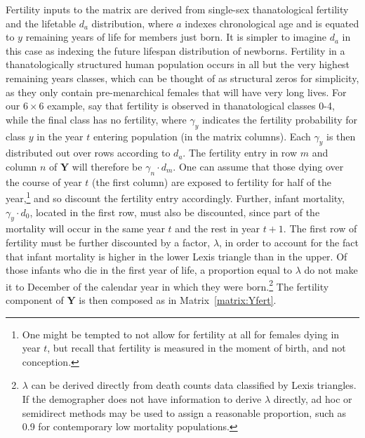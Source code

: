 \documentclass{article}
\begin{document}
 Fertility inputs to the matrix are derived from single-sex thanatological
 fertility and the lifetable $d_a$ distribution, where $a$ indexes
 chronological age and is equated to $y$ remaining years of life for members
 just born. It is simpler to imagine $d_a$ in this case as indexing the
 future lifespan distribution of newborns. Fertility in a thanatologically
 structured human population occurs in all but the very highest remaining years classes, which can be thought of as structural zeros for simplicity, as they only contain pre-menarchical females
 that will have very long lives.
 For our $6\times 6$ example, say that fertility is observed in
 thanatological classes 0-4, while the final class has no fertility, where
 $\gamma_y$ indicates the fertility probability for class $y$ in the year $t$
 entering population (in the matrix columns). Each $\gamma_y$ is then
 distributed out over rows according to $d_a$.
 The fertility entry in row $m$ and column $n$ of $\textbf{Y}$ will therefore be
 $\gamma_n \cdot d_m$. One can assume that those dying over the course of year
 $t$ (the first column) are exposed to fertility for half of the year,\footnote{One might be tempted to not allow for fertility at all for females dying in year $t$, but recall that fertility is measured in the moment of
 birth, and not conception.} and so discount the fertility entry
 accordingly.
 Further, infant mortality, $\gamma_y \cdot d_0$, located in the first row, must also be discounted, since part
 of the mortality will occur in the same year $t$ and the rest in year $t + 1$. 
 The first row of fertility must be further discounted by a factor, $\lambda$,
 in order to account for the fact that infant mortality is higher in the lower Lexis 
 triangle than in the upper. Of those infants who die in the first year of life,
 a proportion equal to $\lambda$ do not make it to December  of the calendar year in which
 they were born.\footnote{$\lambda$ can be derived directly from death counts
 data classified by Lexis triangles. If the demographer
 does not have information to derive $\lambda$ directly, ad hoc or semidirect
 methods may be used to assign a reasonable proportion, such as 0.9 for
 contemporary low mortality populations.} The fertility component of $\textbf{Y}$ is then composed as in Matrix~\ref{matrix:Yfert}.
\end{document}
